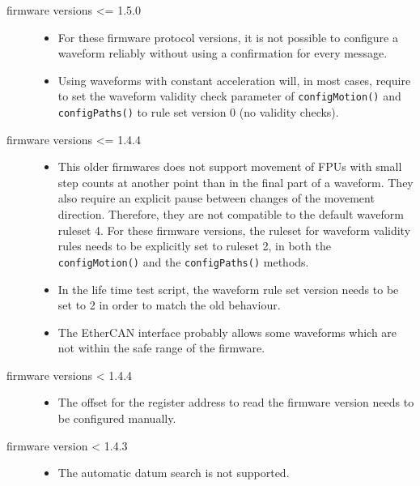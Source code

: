 \documentclass[11pt,a4paper]{report}
\begin{document}
\begin{description}
\item[firmware versions <= 1.5.0]
  
  \begin{itemize}
      
    \item For these firmware protocol versions, it is not possible to
      configure a waveform reliably without using a confirmation for
      every message.
    \item Using waveforms with constant acceleration will, in most
      cases, require to set the waveform validity check parameter of
      \texttt{configMotion()} and \texttt{configPaths()} to rule set
      version 0 (no validity checks).
    
  \end{itemize}

  
\item[firmware versions <= 1.4.4]
  
\begin{itemize}
  \item This older firmwares does not support movement of FPUs with
    small step counts at another point than in the final part of a
    waveform.  They also require an explicit pause between changes of
    the movement direction. Therefore, they are not compatible to the
    default waveform ruleset 4.  For these firmware versions, the
    ruleset for waveform validity rules needs to be explicitly set to
    ruleset 2, in both the \texttt{configMotion()} and the
    \texttt{configPaths()} methods.
    \item In the life time test script, the waveform rule set version
      needs to be set to 2 in order to match the old behaviour.
  
\item The EtherCAN interface probably allows some waveforms which are not within
  the safe range of the firmware.
  \end{itemize}
\item[firmware versions < 1.4.4]
  
\begin{itemize}
\item The offset for the register address to read the firmware version needs
  to be configured manually.
\end{itemize}

\item[firmware version < 1.4.3]
  
  \begin{itemize}
  \item The automatic datum search is not supported.
  \end{itemize}


\end{description}
\end{document}
